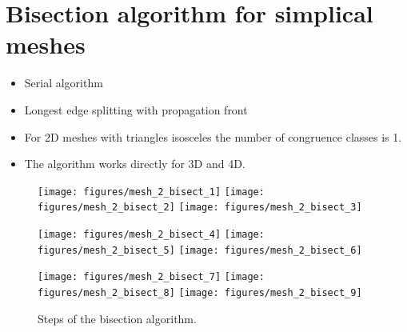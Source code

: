 \documentclass{article}
\begin{document}
\section{Bisection algorithm for simplical meshes}
\label{sec:title}

\begin{itemize}
	\item Serial algorithm
	\item Longest edge splitting with propagation front
	\item For 2D meshes with triangles isosceles the number of congruence classes is 1. 
	\item The algorithm works directly for 3D and 4D.
\end{itemize}


\begin{figure}[htbp]
	\centering
	\parbox{0.8\linewidth}{
	\texttt{[image: figures/mesh\_2\_bisect\_1]} \hfill
	\texttt{[image: figures/mesh\_2\_bisect\_2]} \hfill
	\texttt{[image: figures/mesh\_2\_bisect\_3]} \par
	\texttt{[image: figures/mesh\_2\_bisect\_4]} \hfill
	\texttt{[image: figures/mesh\_2\_bisect\_5]} \hfill
	\texttt{[image: figures/mesh\_2\_bisect\_6]} \par
	\texttt{[image: figures/mesh\_2\_bisect\_7]} \hfill
	\texttt{[image: figures/mesh\_2\_bisect\_8]} \hfill
	\texttt{[image: figures/mesh\_2\_bisect\_9]} \par
	}
	\caption{Steps of the bisection algorithm.}
	\label{fig:label}
\end{figure}
\end{document}
